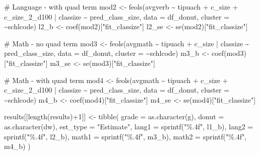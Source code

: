 \documentclass[
  letterpaper,
  DIV=11,
  numbers=noendperiod]{scrartcl}
\newenvironment{Shaded}{\begin{snugshade}}{\end{snugshade}}
\newcommand{\AttributeTok}[1]{\textcolor[rgb]{0.40,0.45,0.13}{#1}}
\newcommand{\CommentTok}[1]{\textcolor[rgb]{0.37,0.37,0.37}{#1}}
\newcommand{\DecValTok}[1]{\textcolor[rgb]{0.68,0.00,0.00}{#1}}
\newcommand{\FunctionTok}[1]{\textcolor[rgb]{0.28,0.35,0.67}{#1}}
\newcommand{\NormalTok}[1]{\textcolor[rgb]{0.00,0.23,0.31}{#1}}
\newcommand{\OtherTok}[1]{\textcolor[rgb]{0.00,0.23,0.31}{#1}}
\newcommand{\SpecialCharTok}[1]{\textcolor[rgb]{0.37,0.37,0.37}{#1}}
\newcommand{\StringTok}[1]{\textcolor[rgb]{0.13,0.47,0.30}{#1}}
\begin{document}
\begin{Shaded}
\begin{Highlighting}[]
    \CommentTok{\# Language {-} with quad term}
\NormalTok{    mod2 }\OtherTok{\textless{}{-}} \FunctionTok{feols}\NormalTok{(avgverb }\SpecialCharTok{\textasciitilde{}}\NormalTok{ tipuach }\SpecialCharTok{+}\NormalTok{ c\_size }\SpecialCharTok{+}\NormalTok{ c\_size\_2\_d100 }\SpecialCharTok{|}\NormalTok{ classize }\SpecialCharTok{\textasciitilde{}}\NormalTok{ pred\_class\_size, }\AttributeTok{data =}\NormalTok{ df\_donut, }\AttributeTok{cluster =} \SpecialCharTok{\textasciitilde{}}\NormalTok{schlcode)}
\NormalTok{    l2\_b }\OtherTok{\textless{}{-}} \FunctionTok{coef}\NormalTok{(mod2)[}\StringTok{"fit\_classize"}\NormalTok{]}
\NormalTok{    l2\_se }\OtherTok{\textless{}{-}} \FunctionTok{se}\NormalTok{(mod2)[}\StringTok{"fit\_classize"}\NormalTok{]}

    \CommentTok{\# Math {-} no quad term}
\NormalTok{    mod3 }\OtherTok{\textless{}{-}} \FunctionTok{feols}\NormalTok{(avgmath }\SpecialCharTok{\textasciitilde{}}\NormalTok{ tipuach }\SpecialCharTok{+}\NormalTok{ c\_size }\SpecialCharTok{|}\NormalTok{ classize }\SpecialCharTok{\textasciitilde{}}\NormalTok{ pred\_class\_size, }\AttributeTok{data =}\NormalTok{ df\_donut, }\AttributeTok{cluster =} \SpecialCharTok{\textasciitilde{}}\NormalTok{schlcode)}
\NormalTok{    m3\_b }\OtherTok{\textless{}{-}} \FunctionTok{coef}\NormalTok{(mod3)[}\StringTok{"fit\_classize"}\NormalTok{]}
\NormalTok{    m3\_se }\OtherTok{\textless{}{-}} \FunctionTok{se}\NormalTok{(mod3)[}\StringTok{"fit\_classize"}\NormalTok{]}

    \CommentTok{\# Math {-} with quad term}
\NormalTok{    mod4 }\OtherTok{\textless{}{-}} \FunctionTok{feols}\NormalTok{(avgmath }\SpecialCharTok{\textasciitilde{}}\NormalTok{ tipuach }\SpecialCharTok{+}\NormalTok{ c\_size }\SpecialCharTok{+}\NormalTok{ c\_size\_2\_d100 }\SpecialCharTok{|}\NormalTok{ classize }\SpecialCharTok{\textasciitilde{}}\NormalTok{ pred\_class\_size, }\AttributeTok{data =}\NormalTok{ df\_donut, }\AttributeTok{cluster =} \SpecialCharTok{\textasciitilde{}}\NormalTok{schlcode)}
\NormalTok{    m4\_b }\OtherTok{\textless{}{-}} \FunctionTok{coef}\NormalTok{(mod4)[}\StringTok{"fit\_classize"}\NormalTok{]}
\NormalTok{    m4\_se }\OtherTok{\textless{}{-}} \FunctionTok{se}\NormalTok{(mod4)[}\StringTok{"fit\_classize"}\NormalTok{]}

\NormalTok{    results[[}\FunctionTok{length}\NormalTok{(results)}\SpecialCharTok{+}\DecValTok{1}\NormalTok{]] }\OtherTok{\textless{}{-}} \FunctionTok{tibble}\NormalTok{(}
      \AttributeTok{grade =} \FunctionTok{as.character}\NormalTok{(g), }\AttributeTok{donut =} \FunctionTok{as.character}\NormalTok{(dw), }\AttributeTok{est\_type =} \StringTok{"Estimate"}\NormalTok{,}
      \AttributeTok{lang1 =} \FunctionTok{sprintf}\NormalTok{(}\StringTok{"\%.4f"}\NormalTok{, l1\_b),}
      \AttributeTok{lang2 =} \FunctionTok{sprintf}\NormalTok{(}\StringTok{"\%.4f"}\NormalTok{, l2\_b),}
      \AttributeTok{math1 =} \FunctionTok{sprintf}\NormalTok{(}\StringTok{"\%.4f"}\NormalTok{, m3\_b),}
      \AttributeTok{math2 =} \FunctionTok{sprintf}\NormalTok{(}\StringTok{"\%.4f"}\NormalTok{, m4\_b)}
\NormalTok{    )}


\end{Highlighting}
\end{Shaded}
\end{document}
